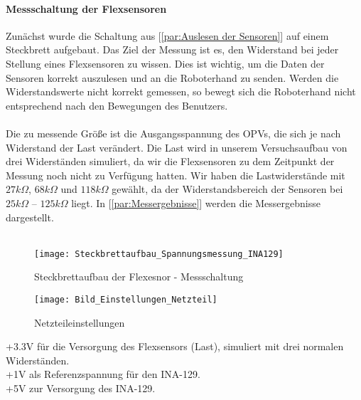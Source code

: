 \documentclass[titlepage,12pt,twoside]{article}
\begin{document}
\paragraph{Messschaltung der Flexsensoren}
\hfill \break
\hfill \break
Zunächst wurde die Schaltung aus [\textcolor{blue}{\autoref{par:Auslesen der Sensoren}}] auf einem Steckbrett aufgebaut. Das Ziel der Messung ist es, den Widerstand 
bei jeder Stellung eines Flexsensoren zu wissen. Dies ist wichtig, um die Daten der Sensoren korrekt auszulesen und an die 
Roboterhand zu senden. Werden die Widerstandswerte nicht korrekt gemessen, so bewegt sich die Roboterhand nicht entsprechend 
nach den Bewegungen des Benutzers. \\
\\
Die zu messende Größe ist die Ausgangsspannung des OPVs, die sich je nach Widerstand der Last verändert. Die Last wird in 
unserem Versuchsaufbau von drei Widerständen simuliert, da wir die Flexsensoren zu dem Zeitpunkt der Messung noch nicht zu 
Verfügung hatten. Wir haben die Lastwiderstände mit $27k\Omega$, $68k\Omega$ und $118k\Omega$ gewählt, da der Widerstandsbereich der Sensoren bei 
$25k\Omega$ – $125k\Omega$ liegt. In [\textcolor{blue}{\autoref{par:Messergebnisse}}] werden die Messergebnisse dargestellt. \\
\\
\begin{figure}[H]
	\begin{center}
		\scalebox{0.8}
		{\texttt{[image: Steckbrettaufbau\_Spannungsmessung\_INA129]}}
		\caption{Steckbrettaufbau der Flexesnor - Messschaltung}
		\label{fig:Steckbrettaufbau_Spannungsmessung_INA129}	
	\end{center}
\end{figure}
\hfill \break
\hfill \break
\begin{figure}[H]
	\begin{center}
		\scalebox{0.8}
		{\texttt{[image: Bild\_Einstellungen\_Netzteil]}}
		\caption{Netzteileinstellungen}
		\label{fig:Bild_Einstellungen_Netzteil}	
	\end{center}
\end{figure}
\hfill \break
+3.3V für die Versorgung des Flexsensors (Last), simuliert mit drei normalen Widerständen.\\
+1V als Referenzspannung für den INA-129.\\
+5V zur Versorgung des INA-129.\\
\\
\newpage
\end{document}
